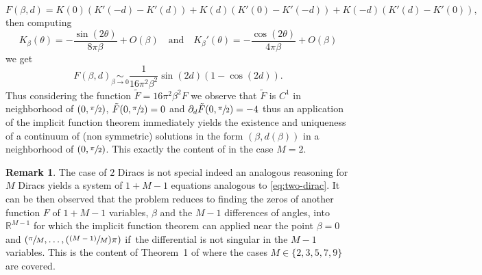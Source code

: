 \documentclass[10pt]{amsart}
\newcommand{\Psfrac}[2]{(\sfrac{#1}{#2})}
\theoremstyle{plain}
\theoremstyle{definition}
\newtheorem{remark}[theorem]{Remark}
\begin{document}
\[
F(\beta,d)=K(0)(K'(-d)-K'(d)) + K(d)(K'(0)-K'(-d)) + K(-d)(K'(d)-K'(0)),
\]
then computing\vspace*{-3pt}
\[
K_{\beta}(\theta)= -\frac{\sin(2\theta)}{8\pi\beta}+O(\beta) \quad\text{and}\quad K_{\beta}'(\theta)= -\frac{\cos(2\theta)}{4\pi\beta}+O(\beta)
\]
we get\vspace*{-3pt}
\[
F(\beta,d)\underset{\beta \to 0}{\sim} \frac{1}{16\pi^2 \beta^2}\sin(2d)(1-\cos(2d)).
\]
Thus considering the function $\tilde{F}=16\pi^2 \beta^2 F$ we observe that $\tilde{F}$ is $C^1$ in neighborhood of $(0,\sfrac{\pi}{2})$, $\tilde{F}(0,\sfrac{\pi}{2})=0$ and $\partial_d\tilde{F}(0,\sfrac{\pi}{2})=-4$ thus an application of the implicit function theorem immediately yields the existence and uniqueness of a continuum of (non symmetric) solutions in the form $(\beta,d(\beta))$ in a neighborhood of $(0,\sfrac{\pi}{2})$. This exactly the content of \cite[Th.\,1]{CKW22} in the case $M=2$.

\begin{remark}\label{Rem: contains ckw}
The case of $2$ Diracs is not special indeed an analogous reasoning for $M$ Diracs yields a system of $1+M-1$ equations analogous to \eqref{eq:two-dirac}. It can be then observed that the problem reduces to finding the zeros of another function $F$ of \hbox{$1+M-1$} variables, $\beta$ and the $M-1$ differences of angles, into $\mathbb{R}^{M-1}$ for which the implicit function theorem can applied near the point $\beta=0$ and $(\sfrac{\pi}{M},\dots,\Psfrac{(M-1)}{M}\pi)$ if~the differential is not singular in the $M-1$ variables. This is the content of Theorem~1 of \cite{CKW22} where the cases $M\in \{2,3,5,7,9\}$ are covered.
\end{remark}
\end{document}
